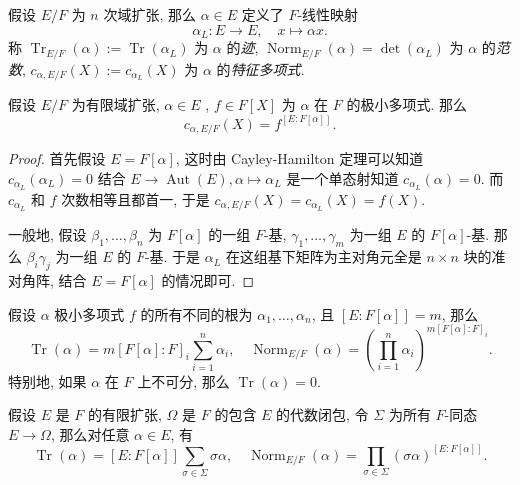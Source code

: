 假设 \( E/F \) 为 \( n \) 次域扩张, 那么 \( \alpha \in E \) 定义了 \( F
\)-线性映射
\[
  \alpha_L: E \to E,\quad x \mapsto \alpha x.
\]
称 \( \operatorname{Tr}_{E/F}(\alpha) := \operatorname{Tr}(\alpha_L) \) 为 \(
\alpha \) 的\emph{迹}, \( \operatorname{Norm}_{E/F}(\alpha) = \det (\alpha_L) \)
为 \( \alpha \) 的\emph{范数}, \( c_{\alpha, E/F}(X) := c_{\alpha_L}(X) \) 为 \(
\alpha \) 的\emph{特征多项式}.

\begin{proposition}
  假设 \( E/F \) 为有限域扩张, \( \alpha \in E \) , \( f \in F[X] \) 为 \(
  \alpha \) 在 \( F \) 的极小多项式.
  那么
  \[
    c_{\alpha, E/F}(X) = f^{[E:F[\alpha]]}.
  \]
\end{proposition}
\begin{proof}
  首先假设 \( E = F[\alpha] \), 这时由 Cayley-Hamilton 定理可以知道 \(
  c_{\alpha_L}(\alpha_L) = 0 \) 结合 \( E \to \operatorname{Aut}(E), \alpha
  \mapsto \alpha_L \) 是一个单态射知道 \( c_{\alpha_L}(\alpha) = 0 \).
  而 \( c_{\alpha_L} \) 和 \( f \) 次数相等且都首一, 于是 \( c_{\alpha, E/F}(X)
  = c_{\alpha_L}(X) = f(X) \).

  一般地, 假设 \( \beta_1, \ldots, \beta_n \) 为 \( F[\alpha] \) 的一组 \( F
  \)-基, \( \gamma_1, \ldots, \gamma_m \) 为一组 \( E \) 的 \( F[\alpha] \)-基.
  那么 \( \beta_i \gamma_j \) 为一组 \( E \) 的 \( F \)-基.
  于是 \( \alpha_L \) 在这组基下矩阵为主对角元全是 \( n \times n \)
  块的准对角阵, 结合 \( E = F[\alpha] \) 的情况即可.
\end{proof}

\begin{corollary}
  \label{corollary-trace-and-norm-and-roots}
  假设 \( \alpha \) 极小多项式 \( f \) 的所有不同的根为 \( \alpha_1, \ldots,
  \alpha_n \), 且 \( [E:F[\alpha]] = m \), 那么
  \[
    \operatorname{Tr}(\alpha) = m[F[\alpha]:F]_i \sum_{i=1}^n \alpha_i,\quad
    \operatorname{Norm}_{E/F}(\alpha) = \left( \prod_{i = 1}^n \alpha_i
    \right)^{m[F[\alpha]:F]_i}.
  \]
  特别地, 如果 \( \alpha \) 在 \( F \) 上不可分, 那么 \(
  \operatorname{Tr}(\alpha) = 0 \).
\end{corollary}

\begin{corollary}
  \label{corollary-generalized-trace-and-norm-and-roots}
  假设 \( E \) 是 \( F \) 的有限扩张, \( \Omega \) 是 \( F \) 的包含 \( E \)
  的代数闭包, 令 \( \Sigma \) 为所有 \( F \)-同态 \( E \to \Omega \), 那么对任意
  \( \alpha \in E \), 有
  \[
    \operatorname{Tr}(\alpha) = [E:F[\alpha]] \sum_{\sigma \in \Sigma} \sigma
    \alpha,\quad \operatorname{Norm}_{E/F}(\alpha) =  \prod_{\sigma \in \Sigma}
    (\sigma\alpha)^{[E:F[\alpha]]}.
  \]
\end{corollary}

